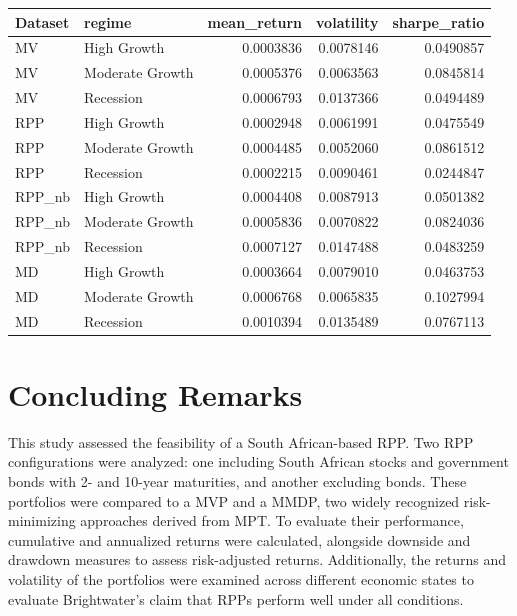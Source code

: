\documentclass[11pt,preprint]{elsarticle}
\let\origtable\table
\let\endorigtable\endtable
\renewenvironment{table}[1][2] {
    \expandafter\origtable\expandafter[H]
} {
    \endorigtable
}
\numberwithin{equation}{section}
\numberwithin{figure}{section}
\numberwithin{table}{section}
\begin{document}
\begin{table}
\centering
\caption{\label{tab:regime}Performance at Different Economic States}
\centering
\begin{tabular}[t]{l|l|r|r|r}
\hline
Dataset & regime & mean\_return & volatility & sharpe\_ratio\\
\hline
MV & High Growth & 0.0003836 & 0.0078146 & 0.0490857\\
\hline
MV & Moderate Growth & 0.0005376 & 0.0063563 & 0.0845814\\
\hline
MV & Recession & 0.0006793 & 0.0137366 & 0.0494489\\
\hline
RPP & High Growth & 0.0002948 & 0.0061991 & 0.0475549\\
\hline
RPP & Moderate Growth & 0.0004485 & 0.0052060 & 0.0861512\\
\hline
RPP & Recession & 0.0002215 & 0.0090461 & 0.0244847\\
\hline
RPP\_nb & High Growth & 0.0004408 & 0.0087913 & 0.0501382\\
\hline
RPP\_nb & Moderate Growth & 0.0005836 & 0.0070822 & 0.0824036\\
\hline
RPP\_nb & Recession & 0.0007127 & 0.0147488 & 0.0483259\\
\hline
MD & High Growth & 0.0003664 & 0.0079010 & 0.0463753\\
\hline
MD & Moderate Growth & 0.0006768 & 0.0065835 & 0.1027994\\
\hline
MD & Recession & 0.0010394 & 0.0135489 & 0.0767113\\
\hline
\end{tabular}
\end{table}

\section{Concluding Remarks}\label{concluding-remarks}

This study assessed the feasibility of a South African-based RPP. Two
RPP configurations were analyzed: one including South African stocks and
government bonds with 2- and 10-year maturities, and another excluding
bonds. These portfolios were compared to a MVP and a MMDP, two widely
recognized risk-minimizing approaches derived from MPT. To evaluate
their performance, cumulative and annualized returns were calculated,
alongside downside and drawdown measures to assess risk-adjusted
returns. Additionally, the returns and volatility of the portfolios were
examined across different economic states to evaluate Brightwater's
claim that RPPs perform well under all conditions.
\end{document}
